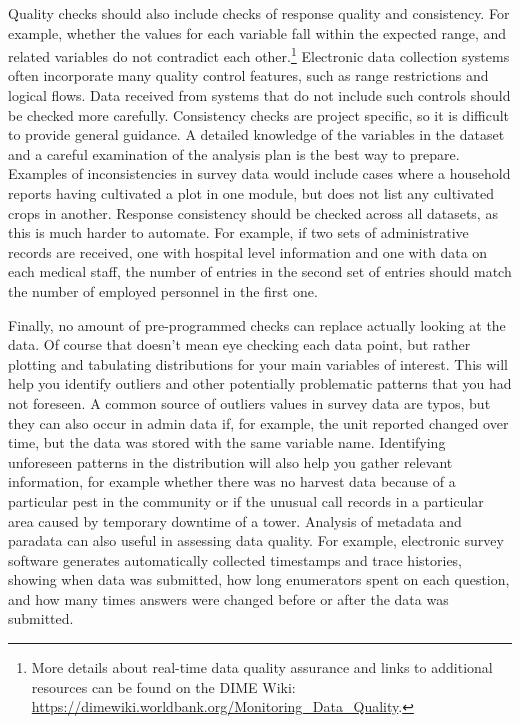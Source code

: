 \documentclass[
]{book}
\begin{document}
Quality checks should also include checks of response quality and consistency.
For example, whether the values for each variable fall within the expected range,
and related variables do not contradict each other.\footnote{More details about real-time data quality assurance
  and links to additional resources
  can be found on the DIME Wiki:
  \url{https://dimewiki.worldbank.org/Monitoring_Data_Quality}.}
Electronic data collection systems often incorporate many quality control features,
such as range restrictions and logical flows.
Data received from systems that do not include such controls should be checked more carefully.
Consistency checks are project specific, so it is difficult to provide general guidance.
A detailed knowledge of the variables in the dataset and a careful examination of the analysis plan
is the best way to prepare.
Examples of inconsistencies in survey data would include cases where
a household reports having cultivated a plot in one module,
but does not list any cultivated crops in another.
Response consistency should be checked across all datasets, as this is much harder to automate.
For example, if two sets of administrative records are received,
one with hospital level information and one with data on each medical staff,
the number of entries in the second set of entries should match
the number of employed personnel in the first one.

Finally, no amount of pre-programmed checks can replace actually looking at the data.
Of course that doesn't mean eye checking each data point,
but rather plotting and tabulating distributions for your main variables of interest.
This will help you identify outliers and
other potentially problematic patterns that you had not foreseen.
A common source of outliers values in survey data are typos,
but they can also occur in admin data if, for example,
the unit reported changed over time,
but the data was stored with the same variable name.
Identifying unforeseen patterns in the distribution will also help you gather relevant information,
for example whether there was no harvest data because of a particular pest in the community
or if the unusual call records in a particular area caused by temporary downtime of a tower.
Analysis of metadata and paradata can also useful in assessing data quality.
For example, electronic survey software generates
automatically collected timestamps and trace histories,
showing when data was submitted, how long enumerators spent on each question,
and how many times answers were changed before or after the data was submitted.
\end{document}
